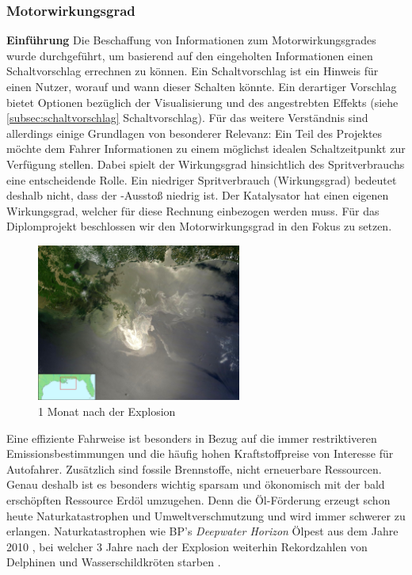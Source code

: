 \subsubsection{Motorwirkungsgrad}
\label{subsec:motorwirkungsgrad}

\textbf{Einführung\newline}
Die Beschaffung von Informationen zum Motorwirkungsgrades wurde durchgeführt, um basierend auf den eingeholten Informationen einen Schaltvorschlag errechnen zu können. Ein Schaltvorschlag ist ein Hinweis für einen Nutzer, worauf und wann dieser Schalten könnte. Ein derartiger Vorschlag bietet Optionen bezüglich der Visualisierung und des angestrebten Effekts (siehe \ref{subsec:schaltvorschlag} Schaltvorschlag). Für das weitere Verständnis sind allerdings einige Grundlagen von besonderer Relevanz:
Ein Teil des Projektes möchte dem Fahrer Informationen zu einem möglichst idealen Schaltzeitpunkt zur Verfügung stellen. Dabei spielt der Wirkungsgrad hinsichtlich des Spritverbrauchs eine entscheidende Rolle. Ein niedriger Spritverbrauch (Wirkungsgrad) bedeutet deshalb nicht, dass der -Ausstoß niedrig ist. Der Katalysator hat einen eigenen Wirkungsgrad, welcher für diese Rechnung einbezogen werden muss. Für das Diplomprojekt beschlossen wir den Motorwirkungsgrad in den Fokus zu setzen.

\begin{figure}\centering
    \includegraphics[width=0.6\textwidth]{images/bpOilSpillSatelite}
    \caption{1 Monat nach der Explosion \cite{SIMR.CH2-motorwirkungsgrad.bpOilSpillSatelite}} \label{Fig:imgBPOilSpill}
\end{figure}
Eine effiziente Fahrweise ist besonders in Bezug auf die immer restriktiveren Emissionsbestimmungen und die häufig hohen Kraftstoffpreise von Interesse für Autofahrer. Zusätzlich sind fossile Brennstoffe, nicht erneuerbare Ressourcen. Genau deshalb ist es besonders wichtig sparsam und ökonomisch mit der bald erschöpften Ressource Erdöl umzugehen. 
Denn die Öl-Förderung erzeugt schon heute Naturkatastrophen und Umweltverschmutzung und wird immer schwerer zu erlangen.
Naturkatastrophen wie BP's \textit{Deepwater Horizon} Ölpest aus dem Jahre 2010 \cite{SIMR.CH2-motorwirkungsgrad.BPSpillGeneral}, bei welcher 3 Jahre nach der Explosion weiterhin Rekordzahlen von Delphinen und Wasserschildkröten starben \cite{SIMR.CH2-motorwirkungsgrad.BPSpillDeaths}. 

